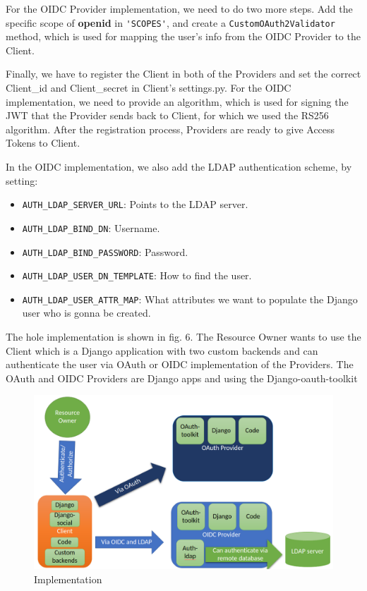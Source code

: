 For the OIDC Provider implementation, we need to do two more steps. Add the specific scope of \textbf{openid} in \verb|'SCOPES'|, and create a \verb|CustomOAuth2Validator| method, which is used for mapping the user's info from the OIDC Provider to the Client. 



Finally, we have to register the Client in both of the Providers and set the correct Client\_id and Client\_secret in Client's settings.py. For the OIDC implementation, we need to provide an algorithm, which is used for signing the JWT that the Provider sends back to Client, for which we used the RS256 algorithm. After the registration process, Providers are ready to give Access Tokens to Client.

In the OIDC implementation, we also add the LDAP authentication scheme, by setting:

\begin{itemize}

	\item \verb|AUTH_LDAP_SERVER_URL|: Points to the LDAP server.

	\item \verb|AUTH_LDAP_BIND_DN|: Username.

	\item \verb|AUTH_LDAP_BIND_PASSWORD|: Password.

	\item \verb|AUTH_LDAP_USER_DN_TEMPLATE|: How to find the user.

	\item \verb|AUTH_LDAP_USER_ATTR_MAP|: What attributes we want to populate the Django user who is gonna be created.

\end{itemize}

The hole implementation is shown in fig. 6. The Resource Owner wants to use the Client which is a Django application with two custom backends and can authenticate the user via OAuth or OIDC implementation of the Providers. The OAuth and OIDC Providers are Django apps and using the Django-oauth-toolkit


\begin{figure}[htb]
	\centering
	\includegraphics[scale=0.5]{figures/implementation.png}
	\caption{Implementation}
\end{figure}

